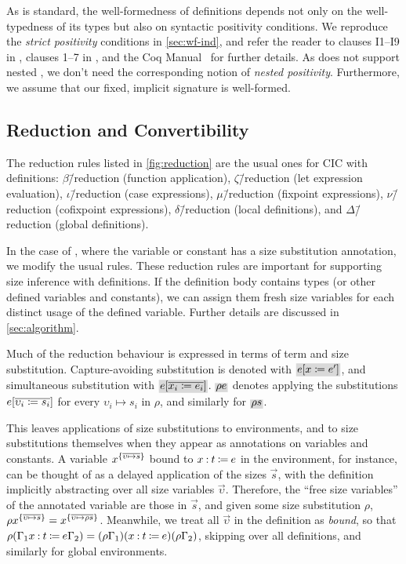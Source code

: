 As is standard, the well-formedness of \coinductive definitions depends not only on the well-typedness of its types but also on syntactic positivity conditions.
We reproduce the \textit{strict positivity} conditions in \autoref{sec:wf-ind}, and refer the reader to clauses I1--I9 in \citet{cic-hat-minus}, clauses 1--7 in \mbox{\citet{cic-hat}}, and the Coq Manual~\citep{coq} for further details.
As \lang does not support nested \coinductives,
we don't need the corresponding notion of \textit{nested positivity}.
Furthermore, we assume that our fixed, implicit signature is well-formed.

\subsection{Reduction and Convertibility}

The reduction rules listed in \autoref{fig:reduction} are the usual ones for CIC with definitions:
$\beta$\=/reduction (function application),
$\zeta$\=/reduction (let expression evaluation),
$\iota$\=/reduction (case expressions),
$\mu$\=/reduction (fixpoint expressions),
$\nu$\=/reduction (cofixpoint expressions),
$\delta$\=/reduction (local definitions), and
$\Delta$\=/reduction (global definitions).



In the case of \deltaDeltareduction, where the variable or constant has a size substitution annotation, we modify the usual rules.
These reduction rules are important for supporting size inference with definitions.
If the definition body contains \coinductive types (or other defined variables and constants), we can assign them fresh size variables for each distinct usage of the defined variable.
Further details are discussed in \autoref{sec:algorithm}.

Much of the reduction behaviour is expressed in terms of term and size substitution.
Capture-avoiding substitution is denoted with $\new{\subst{e}{x}{e'}}$,
and simultaneous substitution with $\new{\substvec{e}{x_i}{e_i}}$.
$\new{\rho e}$ denotes applying the substitutions $e [\overline{\upsilon_i \coloneqq s_i}]$ for every $\upsilon_i \mapsto s_i$ in $\rho$,
and similarly for $\new{\rho s}$.

This leaves applications of size substitutions to environments,
and to size substitutions themselves when they appear as annotations on variables and constants.
A variable $x^{\{\overline{\upsilon \mapsto s}\}}$ bound to $x \mathbin{:} t \mathbin{\coloneqq} e$ in the environment, for instance,
can be thought of as a delayed application of the sizes $\vec{s}$,
with the definition implicitly abstracting over all size variables $\vec{\upsilon}$.
Therefore, the ``free size variables'' of the annotated variable are those in $\vec{s}$,
and given some size substitution $\rho$,
$\rho x^{\{\overline{\upsilon \mapsto s}\}} = x^{\{\overline{\upsilon \mapsto \rho s}\}}$.
Meanwhile, we treat all $\vec{\upsilon}$ in the definition as \emph{bound},
so that $\rho(\Gamma_1 x \mathbin{:} t \mathbin{\coloneqq} e \Gamma_2) = (\rho\Gamma_1)(x \mathbin{:} t \mathbin{\coloneqq} e)(\rho\Gamma_2)$,
skipping over all definitions, and similarly for global environments.

